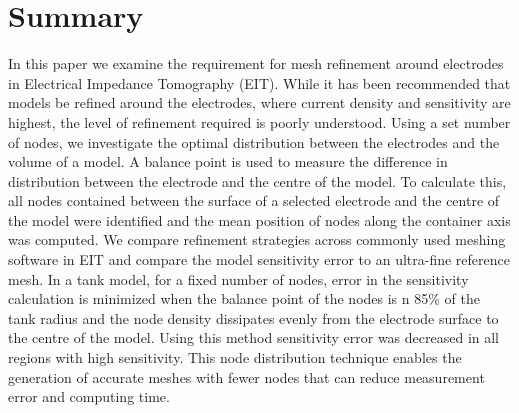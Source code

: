 \section{Summary}
In this paper we examine the requirement for mesh refinement around 
electrodes in Electrical Impedance Tomography (EIT). 
While it has been recommended that  models be refined around the electrodes, where current
density and sensitivity are highest,  the level of refinement required is poorly understood. 
Using a set number of nodes, we investigate the optimal distribution 
between the electrodes and 
the volume of a model. 
A balance point is used to measure the difference in distribution between the electrode and the centre of
the model.
To calculate this, all nodes contained between the surface of a selected electrode and the centre of the model 
were identified and the mean position of nodes along the container axis was computed. 
We compare refinement strategies across commonly used meshing software in EIT and compare the 
model sensitivity error to an ultra-fine reference mesh. 
In a tank model, for a fixed number of nodes, error in the sensitivity calculation is minimized 
when the balance point of the nodes is n  85\% of the tank radius and the node density dissipates evenly 
from the electrode surface to the centre of the model. Using this method sensitivity error was decreased 
in all regions with high sensitivity. This node distribution technique  enables the generation  of accurate 
meshes with fewer nodes that can reduce measurement error and computing time. 
